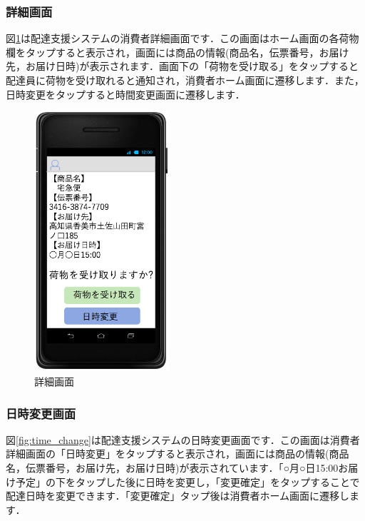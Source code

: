 \documentclass[a4j,titlepage]{jarticle}
\begin{document}
\subsubsection{詳細画面}
図\ref{fig:user_details}は配達支援システムの消費者詳細画面です．この画面はホーム画面の各荷物欄をタップすると表示され，画面には商品の情報(商品名，伝票番号，お届け先，お届け日時)が表示されます．画面下の「荷物を受け取る」をタップすると配達員に荷物を受け取れると通知され，消費者ホーム画面に遷移します．また，日時変更をタップすると時間変更画面に遷移します．
\begin{figure}[H]
 \begin{center}
  \includegraphics[width=50mm]{user_details.png}
	\caption{詳細画面}
	\label{fig:user_details}
 \end{center}

\end{figure}
\newpage
\subsubsection{日時変更画面}
図\ref{fig:time_change}は配達支援システムの日時変更画面です．この画面は消費者詳細画面の「日時変更」をタップすると表示され，画面には商品の情報(商品名，伝票番号，お届け先，お届け日時)が表示されています．「○月○日15:00お届け予定」の下をタップした後に日時を変更し，「変更確定」をタップすることで配達日時を変更できます．「変更確定」タップ後は消費者ホーム画面に遷移します．
\end{document}
